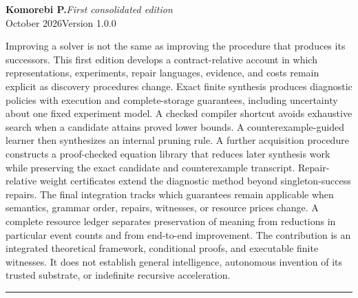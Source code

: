 \documentclass[11pt,letterpaper]{article}
\theoremstyle{plain}
\theoremstyle{definition}
\begin{document}
\hypersetup{pageanchor=false}
\begin{titlepage}\thispagestyle{empty}
\vspace*{.25in}
\par
\vspace{.65in}
\vspace{.19in}
\vspace{.27in}\noindent{\color{ink}\rule{\textwidth}{.85pt}}\par
\vspace{.16in}
\noindent\textbf{Komorebi P.}\hfill\textit{First consolidated edition}\\
 October 2026\hfill Version 1.0.0\par
\vspace{.38in}
\par\smallskip
\noindent Improving a solver is not the same as improving the procedure that produces its successors. This first edition develops a contract-relative account in which representations, experiments, repair languages, evidence, and costs remain explicit as discovery procedures change. Exact finite synthesis produces diagnostic policies with execution and complete-storage guarantees, including uncertainty about one fixed experiment model. A checked compiler shortcut avoids exhaustive search when a candidate attains proved lower bounds. A counterexample-guided learner then synthesizes an internal pruning rule. A further acquisition procedure constructs a proof-checked equation library that reduces later synthesis work while preserving the exact candidate and counterexample transcript. Repair-relative weight certificates extend the diagnostic method beyond singleton-success repairs. The final integration tracks which guarantees remain applicable when semantics, grammar order, repairs, witnesses, or resource prices change. A complete resource ledger separates preservation of meaning from reductions in particular event counts and from end-to-end improvement. The contribution is an integrated theoretical framework, conditional proofs, and executable finite witnesses. It does not establish general intelligence, autonomous invention of its trusted substrate, or indefinite recursive acceleration.
\vfill\noindent\rule{\textwidth}{.4pt}\par\smallskip
{}
\end{titlepage}
\hypersetup{pageanchor=true}
\begingroup\small\setlength{\parskip}{0pt}\tableofcontents\endgroup\clearpage
\end{document}
